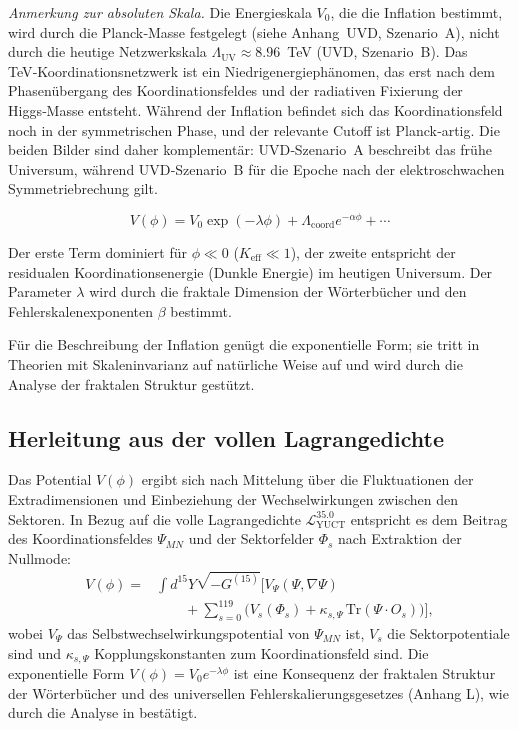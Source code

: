 \documentclass[11pt,a4paper]{article}
\newcommand{\Keff}{K_{\mathrm{eff}}}
\begin{document}
	\noindent\textit{Anmerkung zur absoluten Skala.}
	Die Energieskala \(V_0\), die die Inflation bestimmt, wird durch die Planck‑Masse festgelegt (siehe Anhang~UVD, Szenario~A), nicht durch die heutige Netzwerkskala \(\Lambda_{\mathrm{UV}} \approx 8.96\)~TeV (UVD, Szenario~B). Das TeV‑Koordinationsnetzwerk ist ein Niedrigenergiephänomen, das erst nach dem Phasenübergang des Koordinationsfeldes und der radiativen Fixierung der Higgs‑Masse entsteht. Während der Inflation befindet sich das Koordinationsfeld noch in der symmetrischen Phase, und der relevante Cutoff ist Planck‑artig. Die beiden Bilder sind daher komplementär: UVD‑Szenario~A beschreibt das frühe Universum, während UVD‑Szenario~B für die Epoche nach der elektroschwachen Symmetriebrechung gilt.
	
	\begin{equation}
		V(\phi) = V_0 \exp\left( -\lambda \phi \right) + \Lambda_{\mathrm{coord}} e^{-\alpha \phi} + \cdots
		\label{eq:potential}
	\end{equation}
	
	Der erste Term dominiert für \(\phi \ll 0\) (\(\Keff \ll 1\)), der zweite entspricht der residualen Koordinationsenergie (Dunkle Energie) im heutigen Universum. Der Parameter \(\lambda\) wird durch die fraktale Dimension der Wörterbücher und den Fehlerskalenexponenten \(\beta\) bestimmt.
	
	Für die Beschreibung der Inflation genügt die exponentielle Form; sie tritt in Theorien mit Skaleninvarianz auf natürliche Weise auf und wird durch die Analyse der fraktalen Struktur gestützt.
	
	\subsection{Herleitung aus der vollen Lagrangedichte}
	
	Das Potential \(V(\phi)\) ergibt sich nach Mittelung über die Fluktuationen der Extradimensionen und Einbeziehung der Wechselwirkungen zwischen den Sektoren. In Bezug auf die volle Lagrangedichte \(\mathcal{L}_{\text{YUCT}}^{35.0}\) entspricht es dem Beitrag des Koordinationsfeldes \(\Psi_{MN}\) und der Sektorfelder \(\Phi_s\) nach Extraktion der Nullmode:
	\begin{align}
		V(\phi) = &\int d^{15}Y \sqrt{-G^{(15)}} \Big[ V_{\Psi}(\Psi,\nabla\Psi) \nonumber\\
		&\qquad + \sum_{s=0}^{119} \big( V_s(\Phi_s) + \kappa_{s,\Psi}\,\mathrm{Tr}(\Psi\cdot O_s) \big) \Big],
	\end{align}
	wobei \(V_{\Psi}\) das Selbstwechselwirkungspotential von \(\Psi_{MN}\) ist, \(V_s\) die Sektorpotentiale sind und \(\kappa_{s,\Psi}\) Kopplungskonstanten zum Koordinationsfeld sind. Die exponentielle Form \(V(\phi)=V_0 e^{-\lambda\phi}\) ist eine Konsequenz der fraktalen Struktur der Wörterbücher und des universellen Fehlerskalierungsgesetzes (Anhang L), wie durch die Analyse in \cite{Yakushev2026} bestätigt.
	
\end{document}
